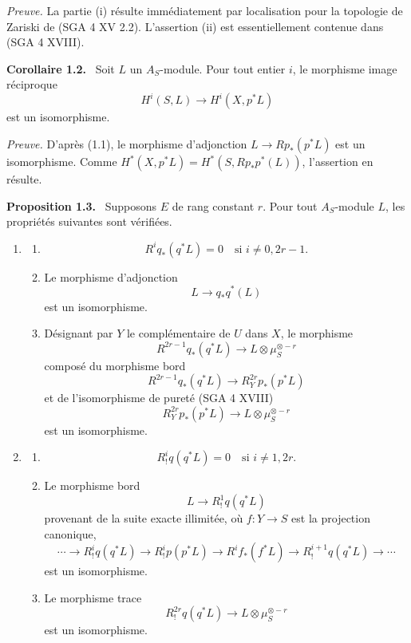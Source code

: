 \documentclass[11pt]{article}
\newenvironment{statement}[1]{\par\medskip\noindent\textbf{#1.}\ }{\par\medskip}
\begin{document}
\emph{Preuve.} La partie (i) résulte immédiatement par localisation pour la topologie de Zariski de (SGA 4 XV 2.2). L'assertion (ii) est essentiellement contenue dans (SGA 4 XVIII).

\begin{statement}{Corollaire 1.2}
Soit $L$ un $A_S$-module. Pour tout entier $i$, le morphisme image réciproque
\[
H^i(S,L)\longrightarrow H^i(X,p^*L)
\]
est un isomorphisme.
\end{statement}

\emph{Preuve.} D'après (1.1), le morphisme d'adjonction $L\to Rp_*(p^*L)$ est un isomorphisme. Comme $H^*(X,p^*L)=H^*(S,Rp_*p^*(L))$, l'assertion en résulte.

\begin{statement}{Proposition 1.3}
Supposons $E$ de rang constant $r$. Pour tout $A_S$-module $L$, les propriétés suivantes sont vérifiées.
\begin{enumerate}[label=(\roman*)]
\item
\begin{enumerate}[label=\alph*)]
\item
\[
R^i q_*(q^*L)=0\quad\text{si }i\ne 0,2r-1.
\]
\item Le morphisme d'adjonction
\[
L\longrightarrow q_*q^*(L)
\]
est un isomorphisme.
\item Désignant par $Y$ le complémentaire de $U$ dans $X$, le morphisme
\[
R^{2r-1}q_*(q^*L)\longrightarrow L\otimes\mu_S^{\otimes -r}
\]
composé du morphisme bord
\[
R^{2r-1}q_*(q^*L)\longrightarrow R_Y^{2r}p_*(p^*L)
\tag{1}
\]
et de l'isomorphisme de pureté (SGA 4 XVIII)
\[
R_Y^{2r}p_*(p^*L)\longrightarrow L\otimes\mu_S^{\otimes -r}
\]
est un isomorphisme.
\end{enumerate}
\item
\begin{enumerate}[label=\alph*)]
\item
\[
R_!^i q(q^*L)=0\quad\text{si }i\ne 1,2r.
\]
\item Le morphisme bord
\[
L\longrightarrow R_!^1 q(q^*L)
\]
provenant de la suite exacte illimitée, où $f:Y\to S$ est la projection canonique,
\[
\cdots\longrightarrow R_!^i q(q^*L)\longrightarrow R_!^i p(p^*L)
\longrightarrow R^i f_*(f^*L)\longrightarrow R_!^{i+1}q(q^*L)\longrightarrow\cdots
\]
est un isomorphisme.
\item Le morphisme trace
\[
R_!^{2r}q(q^*L)\longrightarrow L\otimes\mu_S^{\otimes -r}
\]
est un isomorphisme.
\end{enumerate}
\end{enumerate}
\end{statement}
\end{document}
